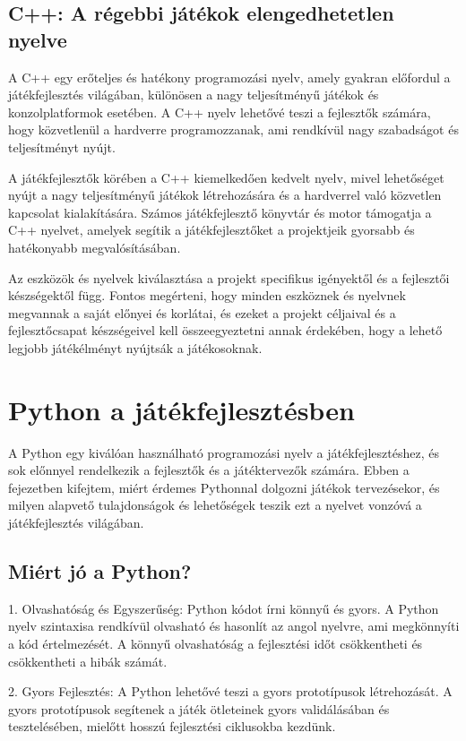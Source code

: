 \subsection{C++: A régebbi játékok elengedhetetlen nyelve}\cite{cpp-doc}

A C++ egy erőteljes és hatékony programozási nyelv, amely gyakran előfordul a játékfejlesztés világában, különösen a nagy teljesítményű játékok és konzolplatformok esetében. A C++ nyelv lehetővé teszi a fejlesztők számára, hogy közvetlenül a hardverre programozzanak, ami rendkívül nagy szabadságot és teljesítményt nyújt.

A játékfejlesztők körében a C++ kiemelkedően kedvelt nyelv, mivel lehetőséget nyújt a nagy teljesítményű játékok létrehozására és a hardverrel való közvetlen kapcsolat kialakítására. Számos játékfejlesztő könyvtár és motor támogatja a C++ nyelvet, amelyek segítik a játékfejlesztőket a projektjeik gyorsabb és hatékonyabb megvalósításában.

Az eszközök és nyelvek kiválasztása a projekt specifikus igényektől és a fejlesztői készségektől függ. Fontos megérteni, hogy minden eszköznek és nyelvnek megvannak a saját előnyei és korlátai, és ezeket a projekt céljaival és a fejlesztőcsapat készségeivel kell összeegyeztetni annak érdekében, hogy a lehető legjobb játékélményt nyújtsák a játékosoknak.


\section{Python a játékfejlesztésben}

A Python egy kiválóan használható programozási nyelv a játékfejlesztéshez, és sok előnnyel rendelkezik a fejlesztők és a játéktervezők számára. Ebben a fejezetben kifejtem, miért érdemes Pythonnal dolgozni játékok tervezésekor, és milyen alapvető tulajdonságok és lehetőségek teszik ezt a nyelvet vonzóvá a játékfejlesztés világában.

\subsection{Miért jó a Python?}
1. Olvashatóság és Egyszerűség:
Python kódot írni könnyű és gyors. A Python nyelv szintaxisa rendkívül olvasható és hasonlít az angol nyelvre, ami megkönnyíti a kód értelmezését. A könnyű olvashatóság a fejlesztési időt csökkentheti és csökkentheti a hibák számát.

2. Gyors Fejlesztés:
A Python lehetővé teszi a gyors prototípusok létrehozását. A gyors prototípusok segítenek a játék ötleteinek gyors validálásában és tesztelésében, mielőtt hosszú fejlesztési ciklusokba kezdünk.

